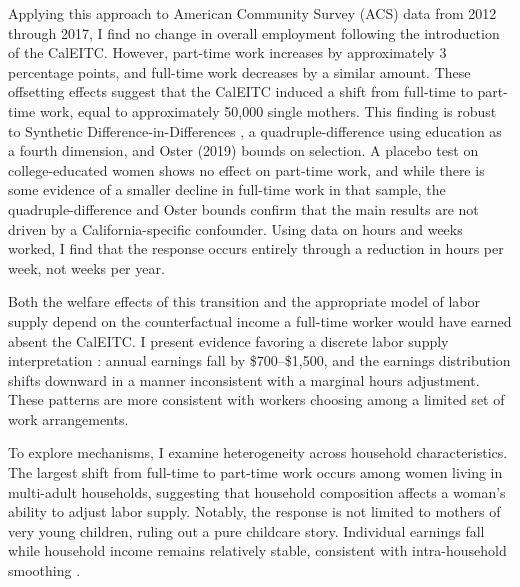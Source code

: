 \documentclass[11pt]{article}
\begin{document}

Applying this approach to American Community Survey (ACS) data from 2012 through 2017, I find no change in overall employment following the introduction of the CalEITC. However, part-time work increases by approximately 3 percentage points, and full-time work decreases by a similar amount. These offsetting effects suggest that the CalEITC induced a shift from full-time to part-time work, equal to approximately 50,000 single mothers. This finding is robust to Synthetic Difference-in-Differences \citep{arkhangelsky_synthetic_2021}, a quadruple-difference using education as a fourth dimension, and Oster (2019) bounds on selection. A placebo test on college-educated women shows no effect on part-time work, and while there is some evidence of a smaller decline in full-time work in that sample, the quadruple-difference and Oster bounds confirm that the main results are not driven by a California-specific confounder. Using data on hours and weeks worked, I find that the response occurs entirely through a reduction in hours per week, not weeks per year.


Both the welfare effects of this transition and the appropriate model of labor supply depend on the counterfactual income a full-time worker would have earned absent the CalEITC. I present evidence favoring a discrete labor supply interpretation \citep{kosonen_discrete_2023}: annual earnings fall by \$700--\$1,500, and the earnings distribution shifts downward in a manner inconsistent with a marginal hours adjustment. These patterns are more consistent with workers choosing among a limited set of work arrangements.


To explore mechanisms, I examine heterogeneity across household characteristics. The largest shift from full-time to part-time work occurs among women living in multi-adult households, suggesting that household composition affects a woman's ability to adjust labor supply. Notably, the response is not limited to mothers of very young children, ruling out a pure childcare story. Individual earnings fall while household income remains relatively stable, consistent with intra-household smoothing \citep{chiappori_collective_1992, blundell_collective_2005}.

\end{document}
